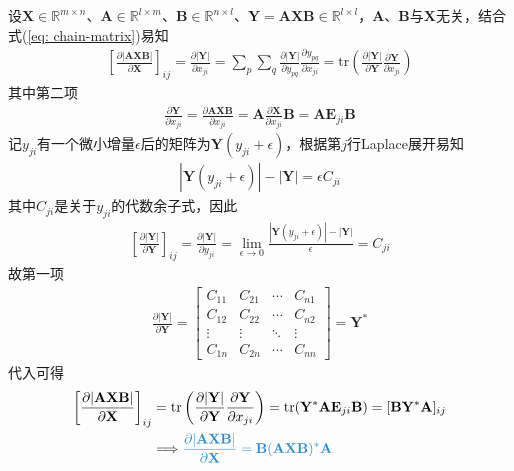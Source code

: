 \documentclass{ctexart}
\newcommand{\blue}[1]{\textcolor{Solarized-blue}{#1}}
\theoremstyle{definition}
\def \Av {\mathbf{A}}
\def \Bv {\mathbf{B}}
\def \Ev {\mathbf{E}}
\def \Xv {\mathbf{X}}
\def \Yv {\mathbf{Y}}
\def \Rbb {\mathbb{R}}
\def \tr {\mathrm{tr}}
\begin{document}
设$\Xv \in \Rbb^{m \times n}$、$\Av \in \Rbb^{l \times m}$、$\Bv \in \Rbb^{n \times l}$、$\Yv = \Av \Xv \Bv \in \Rbb^{l \times l}$，$\Av$、$\Bv$与$\Xv$无关，结合式(\ref{eq: chain-matrix})易知
\begin{align*}
    \left[ \frac{\partial |\Av \Xv \Bv|}{\partial \Xv} \right]_{ij} = \frac{\partial |\Yv|}{\partial x_{ji}} = \sum_p \sum_q \frac{\partial |\Yv|}{\partial y_{pq}}\frac{\partial y_{pq}}{\partial x_{ji}} = \tr \left( \frac{\partial |\Yv|}{\partial \Yv} \frac{\partial \Yv}{\partial x_{ji}} \right)
\end{align*}
其中第二项
\begin{align*}
    \frac{\partial \Yv}{\partial x_{ji}} = \frac{\partial \Av \Xv \Bv}{\partial x_{ji}} = \Av \frac{\partial \Xv}{\partial x_{ji}} \Bv = \Av \Ev_{ji} \Bv
\end{align*}
记$y_{ji}$有一个微小增量$\epsilon$后的矩阵为$\Yv(y_{ji} + \epsilon)$，根据第$j$行Laplace展开易知
\begin{align*}
    |\Yv(y_{ji} + \epsilon)| - |\Yv| = \epsilon C_{ji}
\end{align*}
其中$C_{ji}$是关于$y_{ji}$的\blue{代数余子式}，因此
\begin{align*}
    \left[ \frac{\partial |\Yv|}{\partial \Yv} \right]_{ij} = \frac{\partial |\Yv|}{\partial y_{ji}} = \lim_{\epsilon \rightarrow 0} \frac{|\Yv(y_{ji} + \epsilon)| - |\Yv|}{\epsilon} = C_{ji}
\end{align*}
故第一项
\begin{align*}
    \frac{\partial |\Yv|}{\partial \Yv} = \begin{bmatrix}
        C_{11} & C_{21} & \cdots & C_{n1} \\
        C_{12} & C_{22} & \cdots & C_{n2} \\
        \vdots & \vdots & \ddots & \vdots \\
        C_{1n} & C_{2n} & \cdots & C_{nn}
    \end{bmatrix} = \Yv^*
\end{align*}
代入可得
\begin{align*}
    \left[ \frac{\partial |\Av \Xv \Bv|}{\partial \Xv} \right]_{ij} & = \tr \left( \frac{\partial |\Yv|}{\partial \Yv} \frac{\partial \Yv}{\partial x_{ji}} \right) = \tr (\Yv^* \Av \Ev_{ji} \Bv) = [\Bv \Yv^* \Av]_{ij} \\
                                                                    & \Longrightarrow \blue{\frac{\partial |\Av \Xv \Bv|}{\partial \Xv} = \Bv (\Av \Xv \Bv)^* \Av}
\end{align*}
\end{document}
